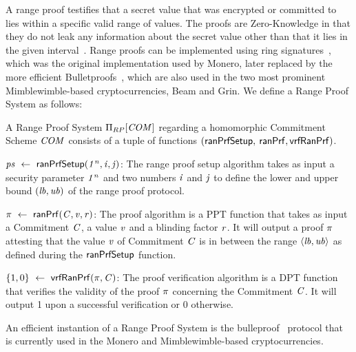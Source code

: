 A range proof testifies that a secret value that was encrypted or committed to lies within a specific valid range of values.
The proofs are Zero-Knowledge in that they do not leak any information about the secret value other than that it lies in the given interval~\cite{bunz2018bulletproofs}.
Range proofs can be implemented using ring signatures~\cite{noether2016ring}, which was the original implementation used by Monero, later replaced by the more efficient Bulletproofs~\cite{bunz2018bulletproofs}, which are also used in the two most prominent Mimblewimble-based cryptocurrencies, Beam and Grin.
We define a Range Proof System as follows:

\begin{definition}\label{def:pre:rangeproof}
    A Range Proof System $\Pi_{RP}[\mathit{COM}]$ regarding a homomorphic Commitment Scheme $\mathit{COM}$ consists of a tuple of functions $(\mathsf{ranPrfSetup},$ $\mathsf{ranPrf}, \mathsf{vrfRanPrf})$.
    \begin{asparaitem}
        \item $\mathit{ps} ~\leftarrow~ \mathsf{ranPrfSetup}(\mathit{1^n},\mathit{i},\mathit{j})$: The range proof setup algorithm takes as input a security parameter $\mathit{1^n}$ and two numbers $\mathit{i}$ and $\mathit{j}$ to define the lower and upper bound $(\mathit{lb}, \mathit{ub})$ of the range proof protocol.
        \item $\pi ~\leftarrow~ \mathsf{ranPrf}(\mathit{C},\mathit{v},\mathit{r})$: The proof algorithm is a PPT function that takes as input a Commitment $\mathit{C}$, a value $\mathit{v}$ and a blinding factor $\mathit{r}$.
        It will output a proof $\pi$ attesting that the value $\mathit{v}$ of Commitment $\mathit{C}$ is in between the range $\langle \mathit{lb}, \mathit{ub} \rangle$ as defined during the $\mathsf{ranPrfSetup}$ function.
        \item $\{1,0\} ~\leftarrow~ \mathsf{vrfRanPrf}(\pi,\mathit{C})$: The proof verification algorithm is a DPT function that verifies the validity of the proof $\pi$ concerning the Commitment $\mathit{C}$.
        It will output 1 upon a successful verification or 0 otherwise.
    \end{asparaitem}
\end{definition}

An efficient instantion of a Range Proof System is the bulleproof~\cite{bunz2018bulletproofs} protocol that is currently used in the Monero and Mimblewimble-based cryptocurrencies.

